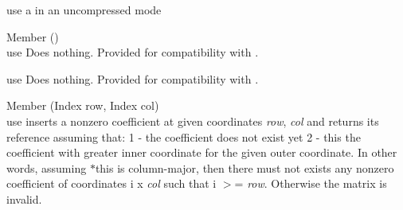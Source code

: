 \begin{DoxyRefList}
\label{deprecated__deprecated000080}%
%
use a  in an uncompressed mode 
\item[Member \doxylink{classEigen_1_1DynamicSparseMatrix_aa806b3dde0a055844110610907b016f3}{Eigen\+::Dynamic\+Sparse\+Matrix\texorpdfstring{$<$}{<} \+\_\+\+Scalar, \+\_\+\+Options, \+\_\+\+Storage\+Index \texorpdfstring{$>$}{>}\+::end\+Fill} ()]\hfill \\
\label{deprecated__deprecated000042}%
%
use  Does nothing. Provided for compatibility with . 

\label{deprecated__deprecated000084}%
%
use  Does nothing. Provided for compatibility with .  
\item[Member \doxylink{classEigen_1_1DynamicSparseMatrix_afc158211a2243770e37684302c5786af}{Eigen\+::Dynamic\+Sparse\+Matrix\texorpdfstring{$<$}{<} \+\_\+\+Scalar, \+\_\+\+Options, \+\_\+\+Storage\+Index \texorpdfstring{$>$}{>}\+::fill} (Index row, Index col)]\hfill \\
\label{deprecated__deprecated000040}%
%
use  inserts a nonzero coefficient at given coordinates {\itshape row}, {\itshape col} and returns its reference assuming that\+: 1 -\/ the coefficient does not exist yet 2 -\/ this the coefficient with greater inner coordinate for the given outer coordinate. In other words, assuming {\ttfamily \texorpdfstring{$\ast$}{*}this} is column-\/major, then there must not exists any nonzero coefficient of coordinates {\ttfamily i} {\ttfamily x} {\itshape col} such that {\ttfamily i} \texorpdfstring{$>$}{>}= {\itshape row}. Otherwise the matrix is invalid.


\end{DoxyRefList}
